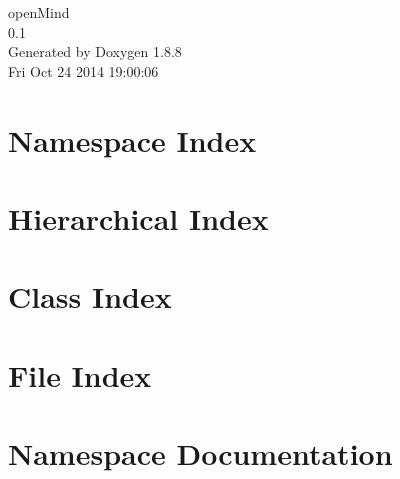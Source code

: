 \documentclass[twoside]{book}
\newcommand{\+}{\discretionary{\mbox{\scriptsize$\hookleftarrow$}}{}{}}
\newcommand{\clearemptydoublepage}{%
  \newpage{\pagestyle{empty}\cleardoublepage}%
}
\begin{document}
\hypersetup{pageanchor=false,
             bookmarks=true,
             bookmarksnumbered=true,
             pdfencoding=unicode
            }
\begin{titlepage}
\vspace*{7cm}
\begin{center}%
{\Large open\+Mind \\[1ex]\large 0.\+1 }\\
\vspace*{1cm}
{\large Generated by Doxygen 1.8.8}\\
\vspace*{0.5cm}
{\small Fri Oct 24 2014 19:00:06}\\
\end{center}
\end{titlepage}
\clearemptydoublepage
\tableofcontents
\clearemptydoublepage
{}
\hypersetup{pageanchor=true}

\chapter{Namespace Index}

\chapter{Hierarchical Index}

\chapter{Class Index}

\chapter{File Index}

\chapter{Namespace Documentation}













\end{document}
